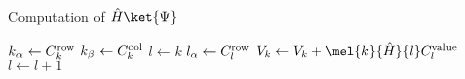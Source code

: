 \begin{algorithm}[H]
 \caption{Computation of $\h \ket{\Psi}$}
 \label{alg:discius}
   \begin{algorithmic}[1]
     \State ${k_\alpha} \gets C^\text{row}_k$
     \State ${k_\beta} \gets C^\text{col}_k$
      \State $l \gets k$
        \State ${l_\alpha} \gets C^\text{row}_l$
          \State $V_{k} \gets V_{k} + \mel{k}{\h}{l} \Cval_l$
        \EndIf
        \State $l \gets l+1$
      \EndWhile
     \EndFor
  \EndFor
\EndFunction
   \end{algorithmic}
\end{algorithm}

